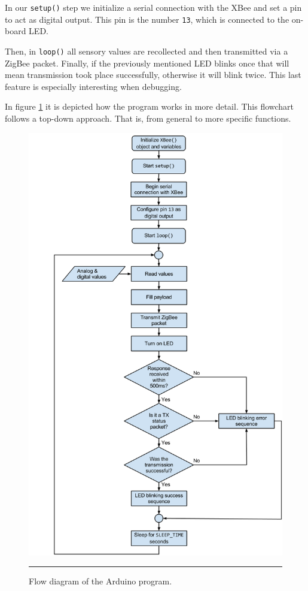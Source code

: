 In our \texttt{setup()} step we initialize a serial connection with the XBee\textregistered{} and set a pin to act as digital output. This pin is the number \texttt{13}, which is connected to the on-board LED.

Then, in \texttt{loop()} all sensory values are recollected and then transmitted via a ZigBee packet. Finally, if the previously mentioned LED blinks once that will mean transmission took place successfully, otherwise it will blink twice. This last feature is especially interesting when debugging.

In figure \ref{fig:ArduinoProgram} it is depicted how the program works in more detail. This flowchart follows a top-down approach. That is, from general to more specific functions.

\begin{figure}[htbp]
    \centering
        \includegraphics[scale=0.35]{./Figures/SensorNodeDia.png}
        \rule{35em}{0.5pt}
    \caption[Flow diagram of an Arduino-based node]{Flow diagram of the Arduino program.}
    \label{fig:ArduinoProgram}
\end{figure}

